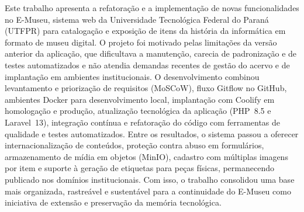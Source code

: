 
\begin{resumoutfpr}
Este trabalho apresenta a refatoração e a implementação de novas funcionalidades no E-Museu, sistema web da Universidade Tecnológica Federal do Paraná (UTFPR) para catalogação e exposição de itens da história da informática em formato de museu digital. O projeto foi motivado pelas limitações da versão anterior da aplicação, que dificultava a manutenção, carecia de padronização e de testes automatizados e não atendia demandas recentes de gestão do acervo e de implantação em ambientes institucionais. O desenvolvimento combinou levantamento e priorização de requisitos (MoSCoW), fluxo Gitflow no GitHub, ambientes Docker para desenvolvimento local, implantação com Coolify em homologação e produção, atualização tecnológica da aplicação (PHP~8.5 e Laravel~13), integração contínua e refatoração do código com ferramentas de qualidade e testes automatizados. Entre os resultados, o sistema passou a oferecer internacionalização de conteúdos, proteção contra abuso em formulários, armazenamento de mídia em objetos (MinIO), cadastro com múltiplas imagens por item e suporte à geração de etiquetas para peças físicas, permanecendo publicado nos domínios institucionais. Com isso, o trabalho consolidou uma base mais organizada, rastreável e sustentável para a continuidade do E-Museu como iniciativa de extensão e preservação da memória tecnológica.
\end{resumoutfpr}
